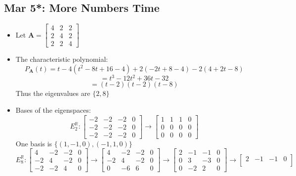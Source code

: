\documentclass[10pt, oneside]{article}
\newcommand{\R}{\mathbb{R}}
\newcommand{\mat}[1]{\mathbf{#1}}
\begin{document}
\subsection{Mar 5*: More Numbers Time}
\begin{itemize}
    \item Let $\mat{A} = \begin{bmatrix}
        4 & 2 & 2\\
        2 & 4 & 2\\
        2 & 2 & 4
    \end{bmatrix}$
    \item The characteristic polynomial:
        \[P_\mat{A}(t) = t-4(t^2 - 8t + 16 - 4) + 2(-2t + 8 - 4) - 2(4 + 2t - 8)\]
        \[= t^3 - 12t^2 + 36t - 32\]
        \[= (t-2)(t-2)(t-8)\]
    Thus the eigenvalues are $\{2,8\}$
    \item Bases of the eigenspaces:
        \[E^\R_2: \begin{bmatrix}
            -2 & -2 & -2 & 0\\
            -2 & -2 & -2 & 0\\
            -2 & -2 & -2 & 0
        \end{bmatrix} \rightarrow 
        \begin{bmatrix}
            1 & 1 & 1 & 0\\
            0 & 0 & 0 & 0\\
            0 & 0 & 0 & 0
        \end{bmatrix}\]
        One basis is $\{(1,-1,0),(-1,1,0)\}$
        \[E^\R_8: \begin{bmatrix}
            4 & -2 & -2 & 0\\
            -2 & 4 & -2 & 0\\
            -2 & -2 & 4 & 0
        \end{bmatrix} \rightarrow
        \begin{bmatrix}
            4 & -2 & -2 & 0\\
            -2 & 4 & -2 & 0\\
            0 & -6 & 6 & 0
        \end{bmatrix} \rightarrow
        \begin{bmatrix}
            2 & -1 & -1 & 0\\
            0 & 3 & -3 & 0\\
            0 & -2 & 2 & 0
        \end{bmatrix} \rightarrow
        \begin{bmatrix}
            2 & -1 & -1 & 0\\

\end{bmatrix}\]
\end{itemize}
\end{document}
